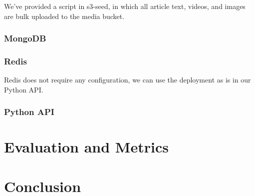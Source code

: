 \documentclass{article}
\begin{document}
    We've provided a script in s3-seed, in which all article text, videos, and images are bulk uploaded to the media bucket.

    \subsubsection{MongoDB}

    \subsubsection{Redis}
    Redis does not require any configuration, we can use the deployment as is in our Python API.

    \subsubsection{Python API}

    \section{Evaluation and Metrics}


    \section{Conclusion}
\end{document}
